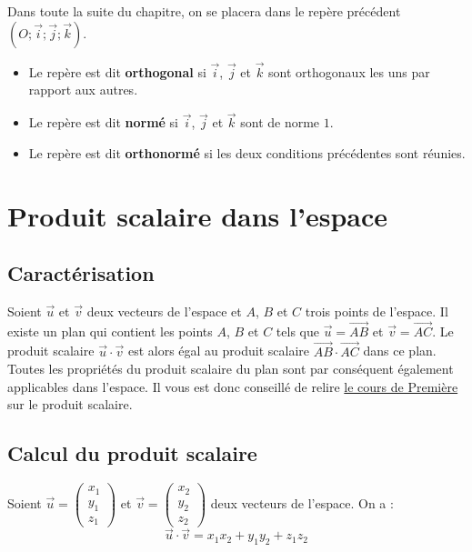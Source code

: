 	Dans toute la suite du chapitre, on se placera dans le repère précédent $(O ; \overrightarrow{i} ; \overrightarrow{j} ; \overrightarrow{k})$.

	\begin{formula}
		\entretitreetliste
		\begin{itemize}
			\item Le repère est dit \textbf{orthogonal} si $\overrightarrow{i}$, $\overrightarrow{j}$ et $\overrightarrow{k}$ sont orthogonaux les uns par rapport aux autres.
			\item Le repère est dit \textbf{normé} si $\overrightarrow{i}$, $\overrightarrow{j}$ et $\overrightarrow{k}$ sont de norme $1$.
			\item Le repère est dit \textbf{orthonormé} si les deux conditions précédentes sont réunies.
		\end{itemize}
	\end{formula}

	\section{Produit scalaire dans l'espace}

	\subsection{Caractérisation}

	Soient $\overrightarrow{u}$ et $\overrightarrow{v}$ deux vecteurs de l'espace et $A$, $B$ et $C$ trois points de l'espace. Il existe un plan qui contient les points $A$, $B$ et $C$ tels que $\overrightarrow{u} = \overrightarrow{AB}$ et $\overrightarrow{v} = \overrightarrow{AC}$. Le produit scalaire $\overrightarrow{u} \cdot \overrightarrow{v}$ est alors égal au produit scalaire $\overrightarrow{AB} \cdot \overrightarrow{AC}$ dans ce plan.
	\newpar
	Toutes les propriétés du produit scalaire du plan sont par conséquent également applicables dans l'espace. Il vous est donc conseillé de relire \href{https://bacomathiqu.es/cours/premiere/geometrie-reperee/#le-produit-scalaire}{le cours de Première} sur le produit scalaire.

	\subsection{Calcul du produit scalaire}

	\begin{formula}
		Soient $\overrightarrow{u} = \begin{pmatrix} {x_1} \\ {y_1} \\ {z_1} \end{pmatrix}$ et $\overrightarrow{v} = \begin{pmatrix} {x_2} \\ {y_2} \\ {z_2} \end{pmatrix}$ deux vecteurs de l'espace.
		\newpar
		On a :
		\[ \overrightarrow{u} \cdot \overrightarrow{v} = x_1x_2 + y_1y_2 + z_1z_2 \]
	\end{formula}

